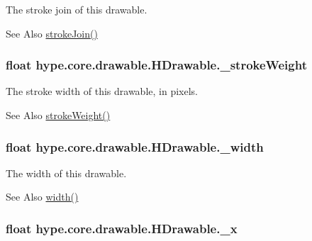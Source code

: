 The stroke join of this drawable. 

\begin{DoxySeeAlso}{See Also}
\hyperlink{classhype_1_1core_1_1drawable_1_1_h_drawable_a4fc12f2585819b1bd9ed0fc60cac74c0}{stroke\-Join()} 
\end{DoxySeeAlso}
\hypertarget{classhype_1_1core_1_1drawable_1_1_h_drawable_ae27cfc0ffd6a6c5e8d44a1b7f017f157}{
\subsubsection[{\-\_\-stroke\-Weight}]{\setlength{\rightskip}{0pt plus 5cm}float hype.\-core.\-drawable.\-H\-Drawable.\-\_\-stroke\-Weight\hspace{0.3cm}{\ttfamily [protected]}}}\label{classhype_1_1core_1_1drawable_1_1_h_drawable_ae27cfc0ffd6a6c5e8d44a1b7f017f157}


The stroke width of this drawable, in pixels. 

\begin{DoxySeeAlso}{See Also}
\hyperlink{classhype_1_1core_1_1drawable_1_1_h_drawable_ab442156bac301c3e89040cbc1d90ce84}{stroke\-Weight()} 
\end{DoxySeeAlso}
\hypertarget{classhype_1_1core_1_1drawable_1_1_h_drawable_a1a040597d04986d5378b477453d987e4}{
\subsubsection[{\-\_\-width}]{\setlength{\rightskip}{0pt plus 5cm}float hype.\-core.\-drawable.\-H\-Drawable.\-\_\-width\hspace{0.3cm}{\ttfamily [protected]}}}\label{classhype_1_1core_1_1drawable_1_1_h_drawable_a1a040597d04986d5378b477453d987e4}


The width of this drawable. 

\begin{DoxySeeAlso}{See Also}
\hyperlink{classhype_1_1core_1_1drawable_1_1_h_drawable_a3c12eb4fa138e5a198ea1634cd2932ca}{width()} 
\end{DoxySeeAlso}
\hypertarget{classhype_1_1core_1_1drawable_1_1_h_drawable_a29a7e29632bdd992ca49c5542ba3cc88}{
\subsubsection[{\-\_\-x}]{\setlength{\rightskip}{0pt plus 5cm}float hype.\-core.\-drawable.\-H\-Drawable.\-\_\-x\hspace{0.3cm}{\ttfamily [protected]}}}\label{classhype_1_1core_1_1drawable_1_1_h_drawable_a29a7e29632bdd992ca49c5542ba3cc88}



